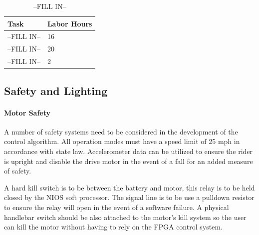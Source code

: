 \documentclass[12pt,article]{IEEEtran}
\begin{document}
        \begin{table}[H]        
            \renewcommand{\arraystretch}{1.3}
                \caption{--FILL IN--}
                
                \label{Expected time for power distrobution system}
                
                \centering
                \begin{tabular}{p{5.5cm}|p{2cm}}
                \hline
                \bfseries   Task                        & \bfseries Labor Hours                         \\
                \hline\hline
                            --FILL IN--                 & 16                                            \\
                            --FILL IN--                 & 20                                            \\  
                            --FILL IN--                 & 2                                             \\  
                            \hline  
                \end{tabular}
        \end{table}
        
    \subsection{\bfseries Safety and Lighting}
        \paragraph{\bfseries Motor Safety}
            A number of safety systems need to be considered in the development of the control algorithm. All 
            operation modes must have a speed limit of 25 mph in accordance with state law. Accelerometer data 
            can be utilized to ensure the rider is upright and disable the drive motor in the event of a fall 
            for an added measure of safety. 
    
            A hard kill switch is to be between the battery and motor, this relay is to be held closed by the NIOS 
            soft processor. The signal line is to be use a pulldown resistor to ensure the relay will open in the 
            event of a software failure. A physical handlebar switch should be also attached to the motor’s kill 
            system so the user can kill the motor without having to rely on the FPGA control system.
        
\end{document}
